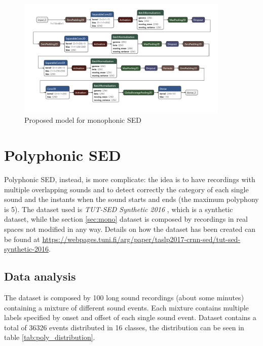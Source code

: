 \documentclass{article}
\begin{document}
\begin{figure}[H]
	\centering
	\includegraphics[width=0.9\textwidth]{./images/mono/new_model.png}	
	\caption{Proposed model for monophonic SED}
	\label{fig:mono_new_model}
\end{figure}


\section{Polyphonic SED}
\label{sec:poly}

Polyphonic SED, instead, is more complicate: the idea is to have recordings with multiple overlapping sounds and to detect correctly the category of each single sound and the instants when the sound starts and ends (the maximum polyphony is 5). The dataset used is \textit{TUT-SED Synthetic 2016} \cite{Cakir_2017}, which is a synthetic dataset, while the section \ref{sec:mono} dataset is composed by recordings in real spaces not modified in any way. Details on how the dataset has been created can be found at \url{https://webpages.tuni.fi/arg/paper/taslp2017-crnn-sed/tut-sed-synthetic-2016}.

\subsection{Data analysis}
\label{subsec:poly_analysis}

The dataset is composed by 100 long sound recordings (about some minutes) containing a mixture of different sound events. Each mixture contains multiple labels specified by onset and offset of each single sound event. Dataset contains a total of 36326 events distributed in 16 classes, the distribution can be seen in table \ref{tab:poly_distribution}.
\end{document}
